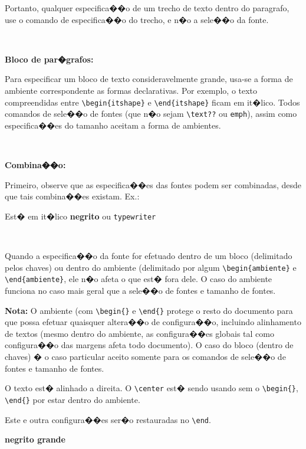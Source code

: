 \documentclass[12pt,a4paper]{article}
\begin{document}
Portanto, qualquer especifica��o de um trecho de texto dentro do paragrafo, 
use o comando de especifica��o do trecho, e n�o a sele��o da fonte.

\

{\bfseries Bloco de par�grafos:}

Para especificar um bloco de texto consideravelmente grande, 
usa-se a forma de ambiente correspondente 
as formas declarativas. 
Por exemplo, o texto compreendidas entre 
\verb|\begin{itshape}| e \verb|\end{itshape}| ficam em it�lico.
 Todos comandos de sele��o de fontes (que n�o sejam \verb+\text??+ ou \verb+emph+), assim como especifica��es do tamanho aceitam a 
 forma de ambientes.

\

{\bfseries Combina��o:}

Primeiro, observe que as especifica��es das fontes podem ser combinadas, 
desde que tais combina��es existam.
Ex.: 
\begin{itshape} 
  Est� em it�lico \textbf{negrito} ou \texttt{typewriter} 
\end{itshape}

\

Quando a especifica��o da fonte for efetuado dentro de um bloco 
(delimitado pelos chaves) ou dentro do ambiente 
(delimitado por algum \verb|\begin{ambiente}| e \verb|\end{ambiente}|, 
ele n�o afeta o que est� fora dele. 
O caso do ambiente funciona no caso mais geral que a sele��o de fontes
e tamanho de fontes. 

\textbf{Nota:} O ambiente (com \verb+\begin{}+ e \verb+\end{}+
protege o resto do documento para que possa efetuar quaisquer 
altera��o de configura��o, incluindo alinhamento de textos 
(mesmo dentro do ambiente, as configura��es globais tal como 
configura��o das margens afeta todo documento). 
O caso do bloco (dentro de chaves) � o caso particular aceito
somente para os comandos de sele��o de fontes e tamanho de fontes.


\begin{flushright} 
  O texto est� alinhado a direita.
  \center O \verb+\center+ est� sendo usando sem o \verb|\begin{}|, \verb|\end{}| 
  por estar dentro do ambiente.
  
  Este e outra configura��es ser�o restauradas no \verb|\end|.

  \flushleft \bfseries \Large negrito grande
\end{flushright}
\end{document}
